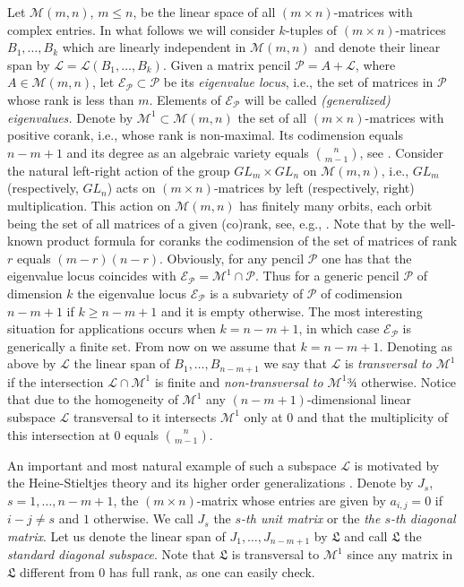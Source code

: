\documentclass[10pt,twoside,a4paper,reqno]{amsart}
\theoremstyle{plain}
\theoremstyle{definition}
\theoremstyle{remark}
\begin{document}
Let  ${\mathcal {M}}(m,n)$, $m\le n$, be the linear space  of all $(m\times n)$-matrices with complex entries. In what follows we will consider $k$-tuples of $(m\times n)$-matrices $B_1,\ldots, B_k$ which are linearly independent in ${\mathcal {M}}(m,n)$ and denote their linear span by ${\mathcal L}={\mathcal L}(B_1,\ldots,B_k)$.
Given a matrix pencil   ${\mathcal P}=A+{\mathcal L}$, where $A\in {\mathcal {M}}(m,n)$, let ${\mathcal E}_{\mathcal P}\subset {\mathcal P}$ be its {\it eigenvalue locus}, i.e., the set of matrices in ${\mathcal P}$ whose rank is less than $m$.  Elements of ${\mathcal E}_{\mathcal P}$ will be called {\it (generalized) eigenvalues.}  Denote by ${\mathcal {M}}^1\subset {\mathcal {M}}(m,n)$ the set of all $(m\times n)$-matrices with positive corank, i.e., whose rank is non-maximal.
Its codimension equals $n-m+1$ and its degree as an algebraic variety equals $\binom {n}{m-1}$,  see
\cite[Proposition 2.15]{BV}.  Consider the natural left-right action of the group $GL_m\times GL_n$ on ${\mathcal {M}}(m,n)$, i.e.,  $GL_m$ (respectively, $GL_n$) acts on $(m\times n)$-matrices by left (respectively, right) multiplication. This action on  ${\mathcal {M}}(m,n)$ has finitely many orbits, each orbit being the set of all matrices of a given (co)rank, see, e.g., \cite[Chap.~I \S 2]{AVG}. Note that by the well-known product formula for coranks the codimension of the set of matrices of rank $r$ equals $(m-r)(n-r)$.  Obviously, for any pencil ${\mathcal P}$ one has that the eigenvalue locus coincides with ${\mathcal E}_{\mathcal P}={\mathcal {M}}^1\cap {\mathcal P}$. Thus for a generic pencil ${\mathcal P}$ of dimension $k$ the eigenvalue locus ${\mathcal E}_{\mathcal P}$ is a subvariety of ${\mathcal P}$ of codimension $n-m+1$ if $k\ge n-m+1$ and it is empty otherwise. The most interesting situation for applications occurs  when $k=n-m+1$, in which case ${\mathcal E}_{\mathcal P}$ is generically a finite set. From now on we assume that $k=n-m+1$. Denoting as above  by ${\mathcal L}$ the linear span of
$B_1,\ldots,B_{n-m+1}$ we say that ${\mathcal L}$ is {\it transversal to ${\mathcal {M}}^1$} if the intersection ${\mathcal L}\cap {\mathcal {M}}^1$ is finite and {\it non-transversal to ${\mathcal {M}}^1$}¾  otherwise.  Notice that due to the homogeneity of ${\mathcal {M}}^1$ any  $(n-m+1)$-dimensional linear subspace ${\mathcal L}$ transversal to it   intersects ${\mathcal {M}}^1$ only at $0$ and that the multiplicity of this intersection at $0$  equals $\binom{n}{m-1}$. 

An important  and most natural example of such  a subspace ${\mathcal L}$ is motivated by the Heine-Stieltjes theory \cite{He} and its higher order generalizations \cite{BBS}.  Denote by $J_s$, $s=1,\ldots,n-m+1$, the $(m\times n)$-matrix whose entries are given by $a_{i,j}=0$ if $i-j\neq s$ and $1$ otherwise. We call $J_s$ the {\it  $s$-th unit matrix} or the {\it  the $s$-th diagonal matrix}. Let us denote  the linear span  of $J_1,\ldots,J_{n-m+1}$ by ${\mathfrak L}$ and call ${\mathfrak L}$ the {\it standard diagonal subspace}. Note that ${\mathfrak L}$ is transversal to ${\mathcal {M}}^1$  since any matrix in ${\mathfrak L}$ different from $0$ has full rank, as one can easily check.
\end{document}
